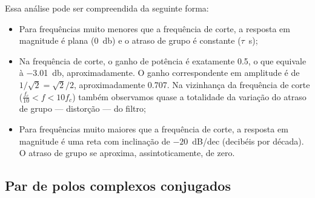 Essa análise pode ser compreendida da seguinte forma:
\begin{itemize}
	\item Para frequências muito menores que a frequência de corte, a resposta em magnitude é plana (\qty{0}{\decibel}) e o atraso de grupo é constante ($\tau$~\unit{\second});
	\item Na frequência de corte, o ganho de potência é exatamente \num{0.5}, o que equivale à \qty{-3.01}{\decibel}, aproximadamente. O ganho correspondente em amplitude é de $1\slash\sqrt{2}=\sqrt{2}\slash2$, aproximadamente \num{0.707}. Na vizinhança da frequência de corte ($\frac{f_c}{10}<f<10f_c$) também observamos quase a totalidade da variação do atraso de grupo --- distorção --- do filtro;
	\item Para frequências muito maiores que a frequência de corte, a resposta em magnitude é uma reta com inclinação de $-20$~\unit{dB}\slash dec (decibéis por década). O atraso de grupo se aproxima, assintoticamente, de zero.
\end{itemize}

\subsection{Par de polos complexos conjugados}
